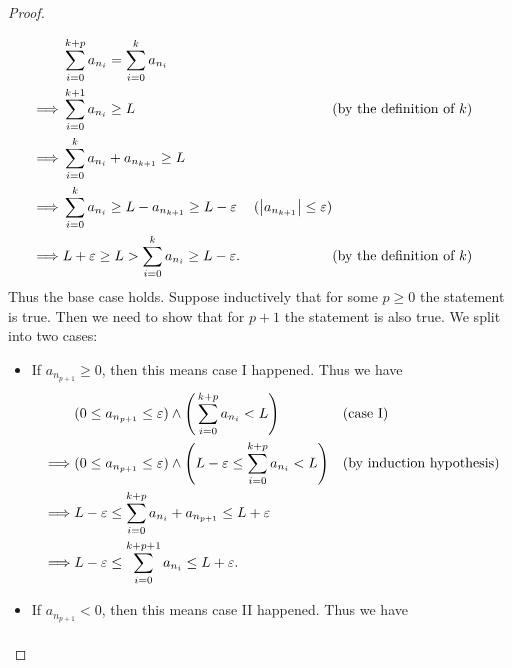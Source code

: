 \begin{proof}
\begin{itemize}
\begin{align*}
                     & \sum_{i = 0}^{k + p} a_{n_i} = \sum_{i = 0}^k a_{n_i}                                                                                                \\
            \implies & \sum_{i = 0}^{k + 1} a_{n_i} \geq L                                   &                                        & \text{(by the definition of \(k\))} \\
            \implies & \sum_{i = 0}^k a_{n_i} + a_{n_{k + 1}} \geq L                                                                                                        \\
            \implies & \sum_{i = 0}^k a_{n_i} \geq L - a_{n_{k + 1}} \geq L - \varepsilon    & (\left\lvert a_{n_{k + 1}}\right\rvert \leq \varepsilon)                                       \\
            \implies & L + \varepsilon \geq L > \sum_{i = 0}^k a_{n_i} \geq L - \varepsilon. &                                        & \text{(by the definition of \(k\))}
          \end{align*}
          Thus the base case holds.
          Suppose inductively that for some \(p \geq 0\) the statement is true.
          Then we need to show that for \(p + 1\) the statement is also true.
          We split into two cases:
          \begin{itemize}
            \item If \(a_{n_{p + 1}} \geq 0\), then this means case I happened.
                  Thus we have
                  \begin{align*}
                             & (0 \leq a_{n_{p + 1}} \leq \varepsilon) \land \Bigg(\sum_{i = 0}^{k + p} a_{n_i} < L\Bigg)                      &  & \text{(case I)} \\
                    \implies & (0 \leq a_{n_{p + 1}} \leq \varepsilon) \land \Bigg(L - \varepsilon \leq \sum_{i = 0}^{k + p} a_{n_i} < L\Bigg) &  & \text{(by induction hypothesis)}           \\
                    \implies & L - \varepsilon \leq \sum_{i = 0}^{k + p} a_{n_i} + a_{n_{p + 1}} \leq L + \varepsilon                                               \\
                    \implies & L - \varepsilon \leq \sum_{i = 0}^{k + p + 1} a_{n_i} \leq L + \varepsilon.
                  \end{align*}
            \item If \(a_{n_{p + 1}} < 0\), then this means case II happened.
                  Thus we have
                  \begin{align*}

\end{align*}
\end{itemize}
\end{itemize}
\end{proof}
